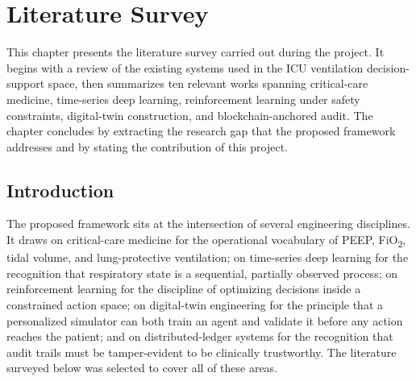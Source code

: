 \documentclass[12pt,a4paper,oneside]{report}
\begin{document}
\chapter{Literature Survey}
\label{ch:lit}

This chapter presents the literature survey carried out during the project. It begins with a review of the existing systems used in the ICU ventilation decision-support space, then summarizes ten relevant works spanning critical-care medicine, time-series deep learning, reinforcement learning under safety constraints, digital-twin construction, and blockchain-anchored audit. The chapter concludes by extracting the research gap that the proposed framework addresses and by stating the contribution of this project.

\section{Introduction}
The proposed framework sits at the intersection of several engineering disciplines. It draws on critical-care medicine for the operational vocabulary of PEEP, FiO\textsubscript{2}, tidal volume, and lung-protective ventilation; on time-series deep learning for the recognition that respiratory state is a sequential, partially observed process; on reinforcement learning for the discipline of optimizing decisions inside a constrained action space; on digital-twin engineering for the principle that a personalized simulator can both train an agent and validate it before any action reaches the patient; and on distributed-ledger systems for the recognition that audit trails must be tamper-evident to be clinically trustworthy. The literature surveyed below was selected to cover all of these areas.
\end{document}
